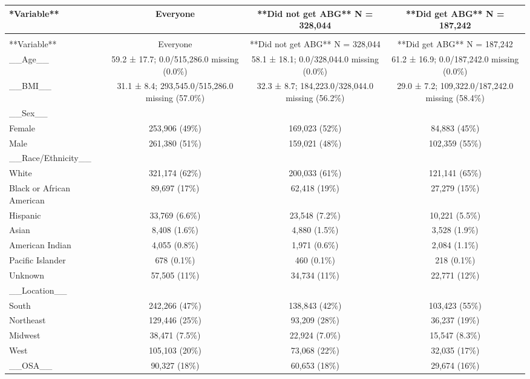 \documentclass[
  11pt,
  letterpaper,
  DIV=11,
  numbers=noendperiod]{scrartcl}
\begin{document}
\begin{longtable*}{>{\raggedright\arraybackslash}p{2.0in}ccc}
\toprule
**Variable** & Everyone & **Did not get ABG**  N = 328,044 & **Did get ABG**  N = 187,242\\
\midrule
\endfirsthead
{}\\
\toprule
**Variable** & Everyone & **Did not get ABG**  N = 328,044 & **Did get ABG**  N = 187,242\\
\midrule
\endhead

\endfoot
\bottomrule
\endlastfoot
\_\_Age\_\_ & 59.2 ± 17.7; 0.0/515,286.0 missing (0.0\%) & 58.1 ± 18.1; 0.0/328,044.0 missing (0.0\%) & 61.2 ± 16.9; 0.0/187,242.0 missing (0.0\%)\\
\_\_BMI\_\_ & 31.1 ± 8.4; 293,545.0/515,286.0 missing (57.0\%) & 32.3 ± 8.7; 184,223.0/328,044.0 missing (56.2\%) & 29.0 ± 7.2; 109,322.0/187,242.0 missing (58.4\%)\\
\_\_Sex\_\_ &  &  & \\
Female & 253,906 (49\%) & 169,023 (52\%) & 84,883 (45\%)\\
Male & 261,380 (51\%) & 159,021 (48\%) & 102,359 (55\%)\\
\addlinespace
\_\_Race/Ethnicity\_\_ &  &  & \\
White & 321,174 (62\%) & 200,033 (61\%) & 121,141 (65\%)\\
Black or African American & 89,697 (17\%) & 62,418 (19\%) & 27,279 (15\%)\\
Hispanic & 33,769 (6.6\%) & 23,548 (7.2\%) & 10,221 (5.5\%)\\
Asian & 8,408 (1.6\%) & 4,880 (1.5\%) & 3,528 (1.9\%)\\
\addlinespace
American Indian & 4,055 (0.8\%) & 1,971 (0.6\%) & 2,084 (1.1\%)\\
Pacific Islander & 678 (0.1\%) & 460 (0.1\%) & 218 (0.1\%)\\
Unknown & 57,505 (11\%) & 34,734 (11\%) & 22,771 (12\%)\\
\_\_Location\_\_ &  &  & \\
South & 242,266 (47\%) & 138,843 (42\%) & 103,423 (55\%)\\
\addlinespace
Northeast & 129,446 (25\%) & 93,209 (28\%) & 36,237 (19\%)\\
Midwest & 38,471 (7.5\%) & 22,924 (7.0\%) & 15,547 (8.3\%)\\
West & 105,103 (20\%) & 73,068 (22\%) & 32,035 (17\%)\\
\_\_OSA\_\_ & 90,327 (18\%) & 60,653 (18\%) & 29,674 (16\%)\\

\end{longtable*}
\end{document}
